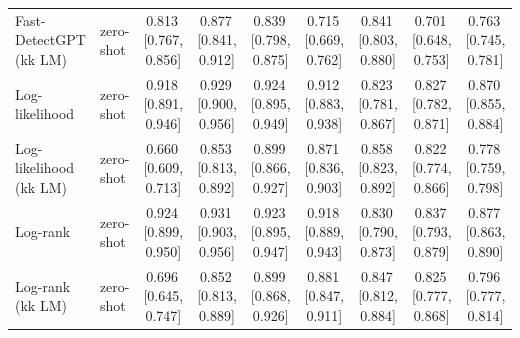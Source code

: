 \begin{table}[t]
\begin{tabular}{llccccccc}
Fast-DetectGPT (kk LM) & zero-shot & 0.813\,{\scriptsize[0.767, 0.856]} & 0.877\,{\scriptsize[0.841, 0.912]} & 0.839\,{\scriptsize[0.798, 0.875]} & 0.715\,{\scriptsize[0.669, 0.762]} & 0.841\,{\scriptsize[0.803, 0.880]} & 0.701\,{\scriptsize[0.648, 0.753]} & 0.763\,{\scriptsize[0.745, 0.781]} \\
Log-likelihood & zero-shot & 0.918\,{\scriptsize[0.891, 0.946]} & 0.929\,{\scriptsize[0.900, 0.956]} & 0.924\,{\scriptsize[0.895, 0.949]} & 0.912\,{\scriptsize[0.883, 0.938]} & 0.823\,{\scriptsize[0.781, 0.867]} & 0.827\,{\scriptsize[0.782, 0.871]} & 0.870\,{\scriptsize[0.855, 0.884]} \\
Log-likelihood (kk LM) & zero-shot & 0.660\,{\scriptsize[0.609, 0.713]} & 0.853\,{\scriptsize[0.813, 0.892]} & 0.899\,{\scriptsize[0.866, 0.927]} & 0.871\,{\scriptsize[0.836, 0.903]} & 0.858\,{\scriptsize[0.823, 0.892]} & 0.822\,{\scriptsize[0.774, 0.866]} & 0.778\,{\scriptsize[0.759, 0.798]} \\
Log-rank & zero-shot & 0.924\,{\scriptsize[0.899, 0.950]} & 0.931\,{\scriptsize[0.903, 0.956]} & 0.923\,{\scriptsize[0.895, 0.947]} & 0.918\,{\scriptsize[0.889, 0.943]} & 0.830\,{\scriptsize[0.790, 0.873]} & 0.837\,{\scriptsize[0.793, 0.879]} & 0.877\,{\scriptsize[0.863, 0.890]} \\
Log-rank (kk LM) & zero-shot & 0.696\,{\scriptsize[0.645, 0.747]} & 0.852\,{\scriptsize[0.813, 0.889]} & 0.899\,{\scriptsize[0.868, 0.926]} & 0.881\,{\scriptsize[0.847, 0.911]} & 0.847\,{\scriptsize[0.812, 0.884]} & 0.825\,{\scriptsize[0.777, 0.868]} & 0.796\,{\scriptsize[0.777, 0.814]} \\
\bottomrule
\end{tabular}
\end{table}